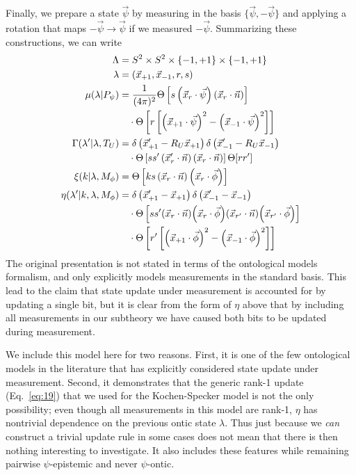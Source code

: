 \documentclass[%
 reprint, onecolumn, 12pt,
superscriptaddress,
nofootinbib,
 prx, 
]{quantumarticle}
\begin{document}
Finally, we prepare a state $\vec\psi$ by measuring in the basis
$\{\vec\psi,-\vec\psi\}$ and applying a rotation that maps
$-\vec\psi\to\vec\psi$ if we measured $-\vec\psi$. Summarizing these
constructions, we can write
\begin{align}
  \Lambda &= S^2\times S^2\times\{-1,+1\}\times\{-1,+1\}\nonumber\\
  \lambda &= (\vec x_{+1},\vec x_{-1}, r,s)\nonumber\\
  \mu(\lambda|P_\psi)
          &= \frac{1}{(4\pi)^2}  \Theta\left[ s\left(\vec x_{r}\cdot\vec\psi \right)\left(\vec x_{r}\cdot\vec n \right) \right]\nonumber\\
          &\quad\cdot\Theta\left[ r\left[
            \left( \vec x_{+1}\cdot\vec \psi \right)^2
            -\left( \vec x_{-1} \cdot\vec\psi \right)^2 \right] \right]\nonumber\\
  \Gamma(\lambda'|\lambda,T_U)
          &=
            \delta\left(\vec x_{+1}'-R_U\vec x_{+1}\right)
            \delta\left(\vec x_{-1}'-R_U\vec x_{-1}\right)\nonumber\\
          &\quad\cdot\Theta\left[ ss'\left( \vec x_r'\cdot \vec n\right)\left( \vec x_r\cdot \vec n \right) \right]
            \Theta[rr'] \nonumber\\
  \xi(k|\lambda,M_\phi) 
          &= \Theta\left[ ks\left( \vec x_r\cdot\vec n \right)
            \left( \vec x_r\cdot\vec \phi \right)\right]\nonumber\\
  \eta(\lambda'|k,\lambda,M_\phi)
          &= \delta\left(\vec x_{+1}'-\vec x_{+1}\right)
            \delta\left(\vec x_{-1}'-\vec x_{-1}\right)\nonumber\\
          &\quad\cdot\Theta\left[ ss'\qty( \vec x_r\cdot \vec n)\qty( \vec x_r\cdot \vec\phi)
            \qty( \vec x_{r'}\cdot \vec n)\qty( \vec x_{r'}\cdot \vec\phi)\right]\nonumber\\
          &\quad\cdot\Theta\left[ r'\left[
            \left( \vec x_{+1}\cdot\vec \phi \right)^2
            -\left( \vec x_{-1} \cdot\vec\phi \right)^2 \right] \right]
\end{align}
The original presentation is not stated in terms of the ontological
models formalism, and only explicitly models measurements in the
standard basis. This lead to the claim that state update under
measurement is accounted for by updating a single bit, but it is clear
from the form of $\eta$ above that by including all measurements in
our subtheory we have caused both bits to be updated during
measurement.

We include this model here for two reasons. First, it is one of the
few ontological models in the literature that has explicitly
considered state update under measurement. Second, it demonstrates
that the generic rank-1 update (Eq.~\ref{eq:19}) that we used for the
Kochen-Specker model is not the only possibility; even though all
measurements in this model are rank-1, $\eta$ has nontrivial
dependence on the previous ontic state $\lambda$. Thus just because we
\emph{can} construct a trivial update rule in some cases does not mean
that there is then nothing interesting to investigate. It also
includes these features while remaining pairwise $\psi$-epistemic and
never $\psi$-ontic.
\end{document}
